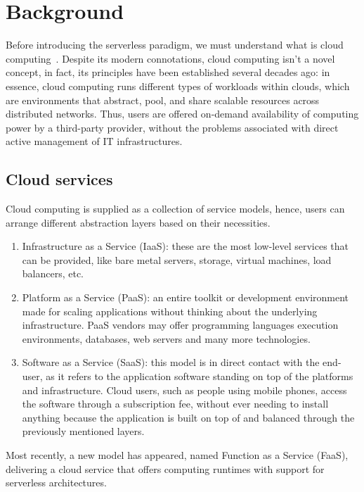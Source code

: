 \chapter{Background}
\label{chap:background}

Before introducing the serverless paradigm,
we must understand what is cloud computing~\cite{nist}.
Despite its modern connotations, cloud computing
isn't a novel concept, in fact, its principles have been established
several decades ago: in essence, cloud computing
runs different types of workloads within clouds, which are environments that abstract, pool,
and share scalable resources across distributed networks.
Thus, users are offered on-demand availability of computing power by a third-party provider,
without the problems associated with direct active management of IT infrastructures.

\section{Cloud services}

Cloud computing is supplied as a collection of service models,
hence, users can arrange different abstraction layers based on their necessities.

\begin{enumerate}
  \item Infrastructure as a Service (IaaS): these are the most low-level services that can be provided,
    like bare metal servers, storage, virtual machines, load balancers, etc.
  \item Platform as a Service (PaaS): an entire toolkit or development environment
    made for scaling applications without thinking about the underlying infrastructure.
    PaaS vendors may offer programming languages execution environments, databases,
    web servers and many more technologies.
  \item Software as a Service (SaaS): this model is in direct contact with the end-user,
    as it refers to the application software standing on top of the platforms and infrastructure.
    Cloud users, such as people using mobile phones, access the software through a subscription fee,
    without ever needing to install anything because the application is built on top of and balanced through
    the previously mentioned layers.
\end{enumerate}

Most recently, a new model has appeared, named Function as a Service (FaaS),
delivering a cloud service that offers computing runtimes with support for serverless architectures.

